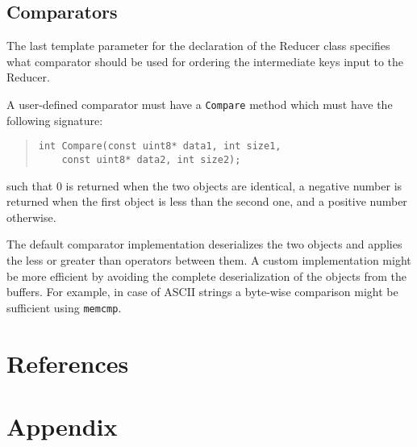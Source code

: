 \documentclass{article}
\begin{document}
\subsection{Comparators}
\label{sec:comparators}

The last template parameter for the declaration of the Reducer class specifies what comparator should be used for ordering the intermediate keys input to the Reducer.

A user-defined comparator must have a \texttt{Compare} method which must have the following signature:
\begin{quote}
\begin{verbatim}
int Compare(const uint8* data1, int size1,
    const uint8* data2, int size2);
\end{verbatim}
\end{quote}
such that 0 is returned when the two objects are identical, a negative number is returned when the first object is less than the second one, and a positive number otherwise.

The default comparator implementation deserializes the two objects and applies the less or greater than operators between them. A custom implementation might be more efficient by avoiding the complete deserialization of the objects from the buffers. For example, in case of ASCII strings a byte-wise comparison might be sufficient using \texttt{memcmp}.

\section{References}



\newpage
\section{Appendix}
\label{sec:appendix_config}
\end{document}
